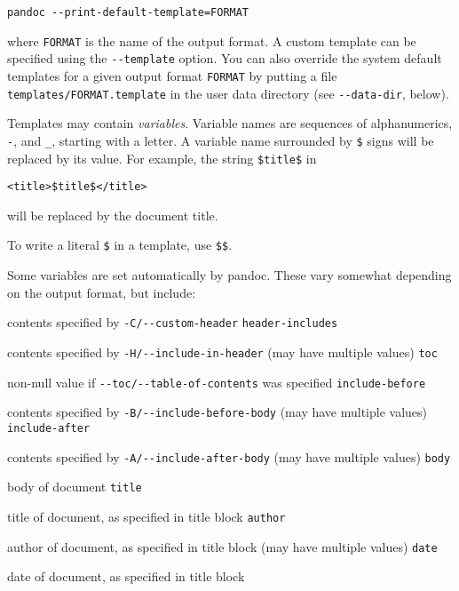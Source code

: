 \documentclass[
  12pt,
  a4paper,
]{article}
\providecommand{\tightlist}{%
  \setlength{\itemsep}{0pt}\setlength{\parskip}{0pt}}
\begin{document}
\begin{verbatim}
pandoc --print-default-template=FORMAT
\end{verbatim}

where \texttt{FORMAT} is the name of the output format. A custom template can
be specified using the \texttt{-\/-template} option. You can also override the
system default templates for a given output format \texttt{FORMAT} by putting
a file \texttt{templates/FORMAT.template} in the user data directory (see
\texttt{-\/-data-dir}, below).

Templates may contain \emph{variables}. Variable names are sequences of
alphanumerics, \texttt{-}, and \texttt{\_}, starting with a letter. A variable
name surrounded by \texttt{\$} signs will be replaced by its value. For
example, the string \texttt{\$title\$} in

\begin{verbatim}
<title>$title$</title>
\end{verbatim}

will be replaced by the document title.

To write a literal \texttt{\$} in a template, use \texttt{\$\$}.

Some variables are set automatically by pandoc. These vary somewhat depending
on the output format, but include:

\begin{description}
\tightlist
\item[\texttt{legacy-header}]
contents specified by \texttt{-C/-\/-custom-header} \texttt{header-includes}

contents specified by \texttt{-H/-\/-include-in-header} (may have multiple
values) \texttt{toc}

non-null value if \texttt{-\/-toc/-\/-table-of-contents} was specified
\texttt{include-before}

contents specified by \texttt{-B/-\/-include-before-body} (may have multiple
values) \texttt{include-after}

contents specified by \texttt{-A/-\/-include-after-body} (may have multiple
values) \texttt{body}

body of document \texttt{title}

title of document, as specified in title block \texttt{author}

author of document, as specified in title block (may have multiple values)
\texttt{date}

date of document, as specified in title block
\end{description}
\end{document}
